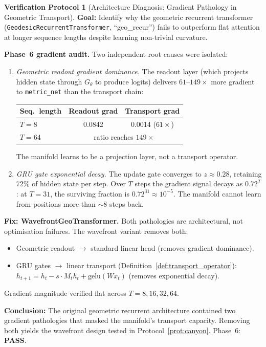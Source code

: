\documentclass[11pt,a4paper]{article}
\theoremstyle{definition}
\newtheorem{protocol}[theorem]{Verification Protocol}
\theoremstyle{remark}
\begin{document}
\begin{protocol}[Architecture Diagnosis: Gradient Pathology in 
Geometric Transport]\label{prot:gradient_audit}
\textbf{Goal:} Identify why the geometric recurrent transformer 
(\texttt{GeodesicRecurrentTransformer}, ``geo\_recur'') fails to 
outperform flat attention at longer sequence lengths despite 
learning non-trivial curvature.

\textbf{Phase~6 gradient audit.} Two independent root causes were 
isolated:

\begin{enumerate}[nosep]
  \item \emph{Geometric readout gradient dominance.} The readout 
  layer (which projects hidden state through $G_\theta$ to produce 
  logits) delivers $61$--$149\times$ more gradient to 
  \texttt{metric\_net} than the transport chain:
  \begin{center}
  \begin{tabular}{lcc}
  \toprule
  Seq.\ length & Readout grad & Transport grad \\
  \midrule
  $T = 8$  & 0.0842 & 0.0014 \quad ($61\times$) \\
  $T = 64$ & \multicolumn{2}{c}{ratio reaches $149\times$} \\
  \bottomrule
  \end{tabular}
  \end{center}
  The manifold learns to be a projection layer, not a transport 
  operator.

  \item \emph{GRU gate exponential decay.} The update gate 
  converges to $z \approx 0.28$, retaining $72\%$ of hidden state 
  per step. Over $T$ steps the gradient signal decays as $0.72^T$:
  at $T = 31$, the surviving fraction is $0.72^{31} \approx 
  10^{-5}$. The manifold cannot learn from positions more than 
  $\sim\!8$ steps back.
\end{enumerate}

\textbf{Fix: WavefrontGeoTransformer.} Both pathologies are 
architectural, not optimisation failures. The wavefront variant 
removes both:
\begin{itemize}[nosep]
  \item Geometric readout $\to$ standard linear head (removes 
  gradient dominance).
  \item GRU gates $\to$ linear transport 
  (Definition~\ref{def:transport_operator}): 
  $h_{t+1} = h_t - s \cdot M_t h_t + \mathrm{gelu}(W x_t)$ 
  (removes exponential decay).
\end{itemize}
Gradient magnitude verified flat across $T = 8, 16, 32, 64$.

\textbf{Conclusion:} The original geometric recurrent architecture 
contained two gradient pathologies that masked the manifold's 
transport capacity. Removing both yields the wavefront design 
tested in Protocol~\ref{prot:canyon}. Phase~6: \textbf{PASS}.
\end{protocol}
\end{document}
